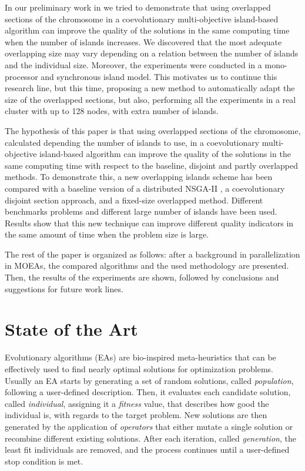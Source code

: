 \documentclass[Crown,sagev,times,doublespace]{sagej}
\begin{document}
In our preliminary work in \citep{Garcia16hpmoonANONYMOUS} we tried to demonstrate that using overlapped sections of the chromosome in a coevolutionary multi-objective island-based algorithm can improve the quality of the solutions in the same computing time when the number of islands increases. We discovered that the most adequate overlapping size may vary depending on a relation between the number of islands and the individual size. Moreover, the experiments were conducted in a mono-processor and synchronous island model. This motivates us to continue this research line, but this time, proposing a new method to automatically adapt the size of the overlapped sections, but also, performing all the experiments in a real cluster with up to 128 nodes, with extra number of islands.


The hypothesis of this paper is that using overlapped sections of the chromosome, calculated depending the number of islands to use, in a coevolutionary multi-objective island-based algorithm can improve the quality of the solutions in the same computing time with respect to the baseline, disjoint and partly overlapped methods. To demonstrate this, a new overlapping islands scheme has been compared with a baseline version of a distributed NSGA-II \citep{Deb00NSGAII}, a coevolutionary disjoint section approach, and a fixed-size overlapped method. Different benchmarks problems and different large number of islands have been used. Results show that this new technique can improve different quality indicators in the same amount of time when the problem size is large. 

The rest of the paper is organized as follows: after a background in parallelization in MOEAs, 
the compared algorithms and the used methodology are presented. %
Then, the results of the experiments are shown, followed by conclusions and suggestions for future work lines.


%
\section{State of the Art}
\label{sec:soa}

Evolutionary algorithms (EAs) \citep{DBLP:series/ncs/EibenS15,DeJong2006} are bio-inspired meta-heuristics that can be effectively used to find nearly optimal solutions for optimization problems. Usually an EA starts by generating a set of random solutions, called \emph{population}, following a user-defined description. Then, it evaluates each candidate solution, called \emph{individual}, assigning it a \emph{fitness} value, that describes how good the individual is, with regards to the target problem. New solutions are then generated by the application of \emph{operators} that either mutate a single solution or recombine different existing solutions. After each iteration, called \emph{generation}, the least fit individuals are removed, and the process continues until a user-defined stop condition is met.
\end{document}
